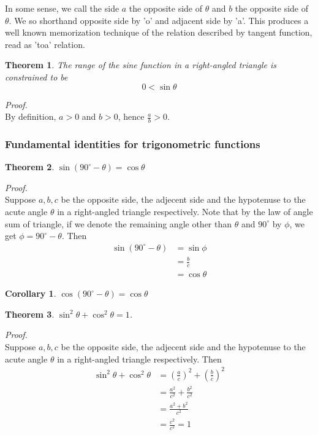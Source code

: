 \documentclass[12pt]{article}
\newtheorem*{theorem}{Theorem}
\newtheorem*{corollary}{Corollary}
\renewenvironment{proof}[1][Proof]{\begin{snugshade*} \textit{{#1}.}\\}{\hfill \qedsymbol \end{snugshade*}}
\begin{document}
    In some sense, we call the side $a$ the opposite side of $\theta$ and $b$ the opposite side of $\theta$. We so shorthand opposite side by 'o' and adjacent side by 'a'. This produces a well known memorization technique of the relation described by tangent function, read as 'toa' relation.

    \begin{theorem}
        The range of the sine function in a right-angled triangle is constrained to be $$0<\sin{\theta}$$
    \end{theorem}

    \begin{proof}
        By definition, $a>0$ and $b>0$, hence $\frac{a}{b}>0$.
    \end{proof}

    \subsubsection*{Fundamental identities for trigonometric functions}

    \begin{theorem}
        $\sin(90^\circ - \theta)=\cos{\theta}$
    \end{theorem}

    \begin{proof}
        Suppose $a,b,c$ be the opposite side, the adjecent side and the hypotenuse to the acute angle $\theta$ in a right-angled triangle respectively. Note that by the law of angle sum of triangle, if we denote the remaining angle other than $\theta$ and $90^\circ$ by $\phi$, we get $\phi = 90^\circ - \theta$. Then \begin{align*}
            \sin(90^\circ - \theta) &= \sin{\phi}\\
            &= \frac{b}{c}\\
            &= \cos{\theta}
        \end{align*}
    \end{proof}

    \begin{corollary}
        $\cos(90^\circ - \theta)=\cos{\theta}$
    \end{corollary}

    \begin{theorem}
        $\sin^2{\theta}+\cos^2{\theta}=1$.
    \end{theorem}

    \begin{proof}
        Suppose $a,b,c$ be the opposite side, the adjecent side and the hypotenuse to the acute angle $\theta$ in a right-angled triangle respectively. Then \begin{align*}
            \sin^2{\theta}+\cos^2{\theta}&=(\frac{a}{c})^2+(\frac{b}{c})^2\\
            &=\frac{a^2}{c^2}+\frac{b^2}{c^2}\\
            &=\frac{a^2+b^2}{c^2}\\
            &=\frac{c^2}{c^2}=1
        \end{align*}
    \end{proof}
\end{document}
